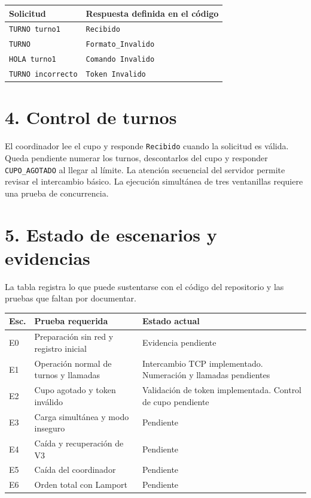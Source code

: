 \documentclass[11pt,a4paper]{article}
\begin{document}
\begin{center}
\begin{tabular}{@{}p{6cm}p{8cm}@{}}
\toprule
\textbf{Solicitud} & \textbf{Respuesta definida en el código}\\
\midrule
\texttt{TURNO turno1} & \texttt{Recibido}\\
\texttt{TURNO} & \texttt{Formato\_Invalido}\\
\texttt{HOLA turno1} & \texttt{Comando Invalido}\\
\texttt{TURNO incorrecto} & \texttt{Token Invalido}\\
\bottomrule
\end{tabular}
\end{center}

\section*{4. Control de turnos}
El coordinador lee el cupo y responde \texttt{Recibido} cuando la solicitud es válida. Queda pendiente numerar los turnos, descontarlos del cupo y responder \texttt{CUPO\_AGOTADO} al llegar al límite. La atención secuencial del servidor permite revisar el intercambio básico. La ejecución simultánea de tres ventanillas requiere una prueba de concurrencia.

\newpage
\section*{5. Estado de escenarios y evidencias}
La tabla registra lo que puede sustentarse con el código del repositorio y las pruebas que faltan por documentar.

\begin{center}
\small
\begin{tabular}{@{}p{1cm}p{6.1cm}p{7.1cm}@{}}
\toprule
\textbf{Esc.} & \textbf{Prueba requerida} & \textbf{Estado actual}\\
\midrule
E0 & Preparación sin red y registro inicial & Evidencia pendiente\\
E1 & Operación normal de turnos y llamadas & Intercambio TCP implementado. Numeración y llamadas pendientes\\
E2 & Cupo agotado y token inválido & Validación de token implementada. Control de cupo pendiente\\
E3 & Carga simultánea y modo inseguro & Pendiente\\
E4 & Caída y recuperación de V3 & Pendiente\\
E5 & Caída del coordinador & Pendiente\\
E6 & Orden total con Lamport & Pendiente\\
\bottomrule
\end{tabular}
\end{center}
\end{document}
